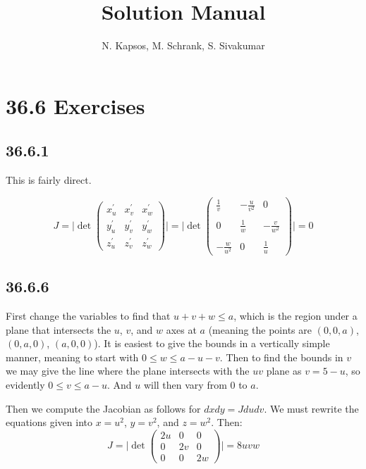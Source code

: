 \documentclass{article}
\title{Solution Manual}
\author{N. Kapsos, M. Schrank, S. Sivakumar}
\date{}
\begin{document}
\maketitle
\setcounter{secnumdepth}{0}

\section{36.6 Exercises}

\subsection{36.6.1}

This is fairly direct.

$$J = \bigg|\det \begin{pmatrix}
    x^{\prime}_u &x^{\prime}_v &x^{\prime}_w  \\
    y^{\prime}_u &y^{\prime}_v &y^{\prime}_w  \\
    z^{\prime}_u &z^{\prime}_v &z^{\prime}_w 
\end{pmatrix} \bigg| = \bigg|\det \begin{pmatrix}
   \frac{1}{v} &-\frac{u}{v^2} &0 \\
   \\
   0 &\frac{1}{w} &-\frac{v}{w^2} \\
   \\
   -\frac{w}{u^2}&0 &\frac{1}{u}
\end{pmatrix} \bigg| = 0$$

\subsection{36.6.6}

First change the variables to find that $u+v+w\leq a$, which is the region under a plane that intersects the $u$, $v$, and $w$ axes at $a$ (meaning the points are $(0,0,a)$, $(0,a,0)$, $(a,0,0)$). It is easiest to give the bounds in a vertically simple manner, meaning to start with $0\leq w\leq a-u-v$. Then to find the bounds in $v$ we may give the line where the plane intersects with the $uv$ plane as $v=5-u$, so evidently $0\leq v\leq a-u$. And $u$ will then vary from $0$ to $a$.

Then we compute the Jacobian as follows for $dxdy = Jdudv$. We must rewrite the equations given into $x=u^2$, $y=v^2$, and $z=w^2$.
Then:
$$J = \bigg|\det \begin{pmatrix}
    2u &0 &0 \\
    0 &2v &0 \\
    0 &0 &2w 
 \end{pmatrix} \bigg| = 8uvw$$
\end{document}
